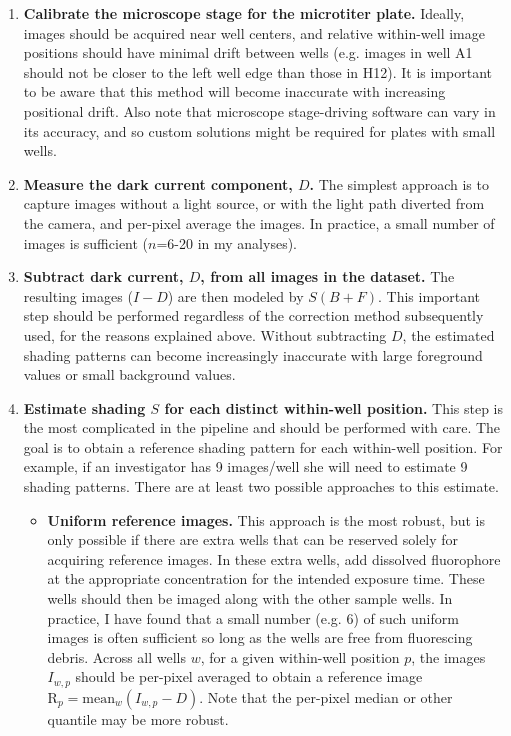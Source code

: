 \begin{enumerate}

\item \textbf{Calibrate the microscope stage for the microtiter plate.}
Ideally, images should be acquired near well centers,
and relative within-well image positions should have
minimal drift between wells (e.g. images in well A1
should not be closer to the left well edge than those in H12).
It is important to be aware that this method will become
inaccurate with increasing positional drift. Also note that
microscope stage-driving software can vary in its accuracy,
and so custom solutions might be required for plates with
small wells.

\item \textbf{Measure the dark current component, $D$.}
The simplest approach is to capture images without a light
source, or with the light path diverted from the camera,
and per-pixel average the images. In practice, a small
number of images is sufficient ($n$=6-20 in my analyses).

\item \textbf{Subtract dark current, $D$, from all images in
the dataset.} The resulting images ($I-D$) are then modeled
by $S(B+F)$. This important step should be performed
regardless of the correction method subsequently
used, for the reasons explained above.
Without subtracting $D$, the estimated shading
patterns can become increasingly inaccurate with large
foreground values or small background values.

\item \textbf{Estimate shading $S$ for each distinct within-well
position.} This step is the most complicated in the pipeline
and should be performed with care. The goal is to obtain a
reference shading pattern for each within-well position.
For example, if an investigator has 9 images/well she will
need to estimate 9 shading patterns. There are at least two
possible approaches to this estimate.

\begin{itemize}

\item \textbf{Uniform reference images.} This approach
is the most robust, but is only possible if
there are extra wells that can be reserved solely for
acquiring reference images. In these extra wells, 
add dissolved fluorophore at the appropriate
concentration for the intended exposure time.
These wells should then be imaged along with the
other sample wells. In practice, I have found that a
small number (e.g. 6) of such uniform images is often
sufficient so long as the wells are free from fluorescing
debris. Across all wells $w$, for a given within-well
position $p$, the images $I_{w,p}$ should be per-pixel averaged
to obtain a reference image $\text{R}_p=\text{mean}_w (I_{w,p}-D)$.
Note that the per-pixel median or other quantile may
be more robust.


\end{itemize}
\end{enumerate}
